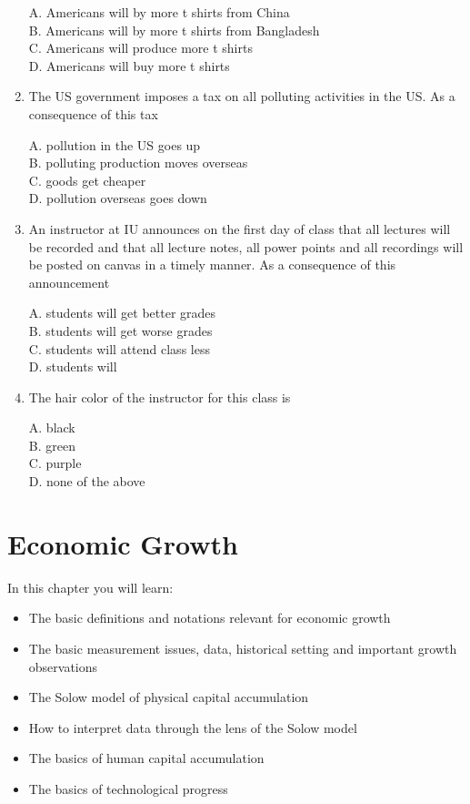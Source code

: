 \documentclass[
]{book}
\providecommand{\tightlist}{%
  \setlength{\itemsep}{0pt}\setlength{\parskip}{0pt}}
\begin{document}
\begin{enumerate}
  A. Americans will by more t shirts from China\\
  B. Americans will by more t shirts from Bangladesh\\
  C. Americans will produce more t shirts\\
  D. Americans will buy more t shirts
\item
  The US government imposes a tax on all polluting activities in the US. As a consequence of this tax

  A. pollution in the US goes up\\
  B. polluting production moves overseas\\
  C. goods get cheaper\\
  D. pollution overseas goes down
\item
  An instructor at IU announces on the first day of class that all lectures will be recorded and that all lecture notes, all power points and all recordings will be posted on canvas in a timely manner. As a consequence of this announcement

  A. students will get better grades\\
  B. students will get worse grades\\
  C. students will attend class less\\
  D. students will
\item
  The hair color of the instructor for this class is

  A. black\\
  B. green\\
  C. purple\\
  D. none of the above
\end{enumerate}

\hypertarget{growth}{%
\chapter{Economic Growth}\label{growth}}

In this chapter you will learn:

\begin{itemize}
\tightlist
\item
  The basic definitions and notations relevant for economic growth
\item
  The basic measurement issues, data, historical setting and important growth observations
\item
  The Solow model of physical capital accumulation
\item
  How to interpret data through the lens of the Solow model
\item
  The basics of human capital accumulation
\item
  The basics of technological progress
\end{itemize}
\end{document}
